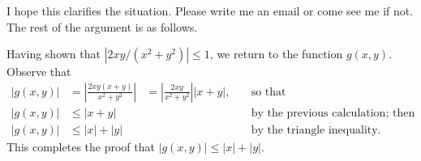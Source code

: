 \documentclass[12pt]{amsart}
\begin{document}
I hope this clarifies the situation. Please write me an email or come see me if not. The rest of the argument is as follows.

Having shown that $|2xy/(x^2+y^2)| \leq 1$, we return to the function $g(x,y)$. Observe that
\begin{align*}
    |g(x,y)| &= \left| \frac{2xy(x+y)}{x^2+y^2} \right| &= \left| \frac{2xy}{x^2+y^2} \right| |x+y|, &\quad \text{so that} \\
    |g(x,y)| &\leq |x+y| & &\quad \text{by the previous calculation; then} \\
    |g(x,y)| &\leq |x| + |y| & &\quad \text{by the triangle inequality.}
\end{align*} 
This completes the proof that $|g(x,y)| \leq |x| + |y|$.
\end{document}
